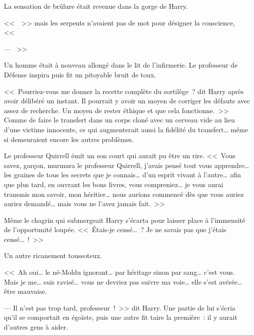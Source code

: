 La sensation de brûlure était revenue dans la gorge de Harry.

<<~~>> mais les serpents n'avaient pas de mot pour désigner la conscience, <<~

--- ~>>

Un homme était à nouveau allongé dans le lit de l'infirmerie. Le professeur de Défense inspira puis fit un pitoyable bruit de toux.

<<~Pourriez-vous me donner la recette complète du sortilège~? dit Harry après avoir délibéré un instant. Il pourrait y avoir un moyen de corriger les défauts avec assez de recherche. Un moyen de rester éthique et que cela fonctionne.~>> Comme de faire le transfert dans un corps cloné avec un cerveau vide au lieu d'une victime innocente, ce qui augmenterait aussi la fidélité du transfert… même si demeuraient encore les autres problèmes.

Le professeur Quirrell émit un son court qui aurait pu être un rire. <<~Vous savez, garçon, murmura le professeur Quirrell, j'avais pensé tout vous apprendre… les graines de tous les secrets que je connais… d'un esprit vivant à l'autre… afin que plus tard, en ouvrant les bons livres, vous compreniez… je vous aurai transmis mon savoir, mon héritier… nous aurions commencé dès que vous auriez auriez demandé… mais vous ne l'avez jamais fait.~>>

Même le chagrin qui submergeait Harry s'écarta pour laisser place à l'immensité de l'opportunité loupée. <<~Étais-je censé…~? Je ne savais pas que j'étais censé…~!~>>

Un autre ricanement toussoteux.

<<~Ah oui… le né-Moldu ignorant… par héritage sinon par sang… c'est vous. Mais je me… suis ravisé… vous ne devriez pas suivre ma voie… elle s'est avérée… être mauvaise.

--- Il n'est pas trop tard, professeur~!~>> dit Harry. Une partie de lui s'écria qu'il se comportait en égoïste, puis une autre fit taire la première~: il y aurait d'autres gens à aider.

